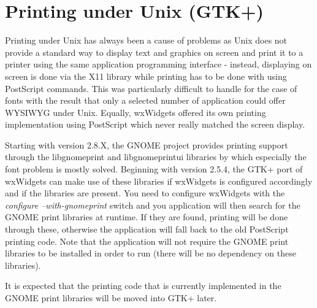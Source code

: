 \section{Printing under Unix (GTK+)}\label{unixprinting}

Printing under Unix has always been a cause of problems as Unix
does not provide a standard way to display text and graphics
on screen and print it to a printer using the same application
programming interface - instead, displaying on screen is done
via the X11 library while printing has to be done with using
PostScript commands. This was particularly difficult to handle
for the case of fonts with the result that only a selected
number of application could offer WYSIWYG under Unix. Equally,
wxWidgets offered its own printing implementation using PostScript
which never really matched the screen display.

Starting with version 2.8.X, the GNOME project provides printing
support through the libgnomeprint and libgnomeprintui libraries
by which especially the font problem is mostly solved. Beginning
with version 2.5.4, the GTK+ port of wxWidgets can make use of
these libraries if wxWidgets is configured accordingly and if the
libraries are present. You need to configure wxWidgets with the
{\it configure --with-gnomeprint} switch and you application will
then search for the GNOME print libraries at runtime. If they
are found, printing will be done through these, otherwise the
application will fall back to the old PostScript printing code.
Note that the application will not require the GNOME print libraries
to be installed in order to run (there will be no dependency on
these libraries).

It is expected that the printing code that is currently implemented
in the GNOME print libraries will be moved into GTK+ later.

